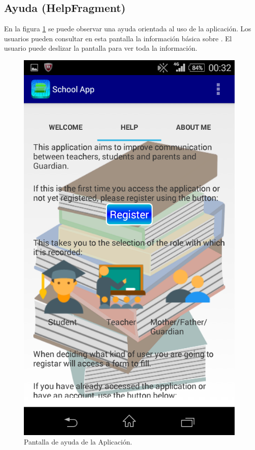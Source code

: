 		\subsection{Ayuda ({\ttfamily HelpFragment})}
			
			En la figura \ref{fig:help} se puede observar una ayuda orientada al uso de la aplicación. Los usuarios pueden consultar en esta pantalla la información básica sobre \CollegeApp. El usuario puede deslizar la pantalla para ver toda la información.
			
			\begin{figure}[h !]
				\centering
				\includegraphics[scale=0.3]{Imagenes/App/help}
				\caption{Pantalla de ayuda de la Aplicación.}
				\label{fig:help}
			\end{figure}
		
